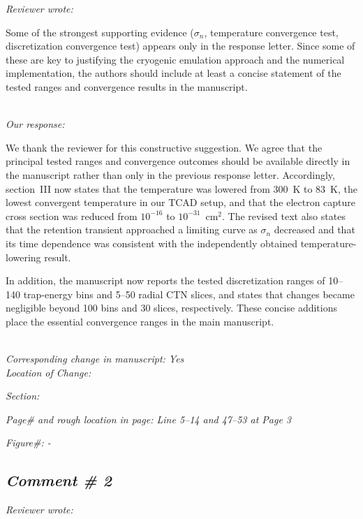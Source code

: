 \documentclass[11pt]{article}
\begin{document}
\noindent \textit{Reviewer wrote:}

Some of the strongest supporting evidence ($\sigma_n$, temperature convergence test, discretization convergence test) appears only in the response letter.
Since some of these are key to justifying the cryogenic emulation approach and the numerical implementation, the authors should include at least a concise statement of the tested ranges and convergence results in the manuscript.

\noindent \textit{\\Our response:}

We thank the reviewer for this constructive suggestion.
We agree that the principal tested ranges and convergence outcomes should be available directly in the manuscript rather than only in the previous response letter.
Accordingly, section~III now states that the temperature was lowered from 300~K to 83~K, the lowest convergent temperature in our TCAD setup, and that the electron capture cross section was reduced from $10^{-16}$ to $10^{-31}$~cm$^2$.
The revised text also states that the retention transient approached a limiting curve as $\sigma_n$ decreased and that its time dependence was consistent with the independently obtained temperature-lowering result.

In addition, the manuscript now reports the tested discretization ranges of 10--140 trap-energy bins and 5--50 radial CTN slices, and states that changes became negligible beyond 100 bins and 30 slices, respectively.
These concise additions place the essential convergence ranges in the main manuscript.

\noindent \textit{\\Corresponding change in manuscript: Yes \\Location of Change:}

\hspace{40pt} \noindent \textit{Section: \uppercase\expandafter{}}

\hspace{40pt} \noindent \textit{Page\# and rough location in page: Line 5--14 and 47--53 at Page 3}

\hspace{40pt} \noindent \textit{Figure\#: -}

\subsection*{\textit{Comment \# 2}}

\noindent \textit{Reviewer wrote:}
\end{document}
